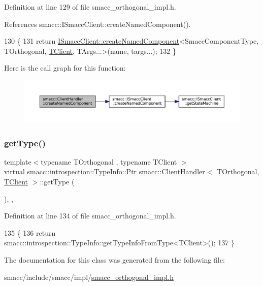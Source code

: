 Definition at line 129 of file smacc\+\_\+orthogonal\+\_\+impl.\+h.



References smacc\+::\+I\+Smacc\+Client\+::create\+Named\+Component().


\begin{DoxyCode}
130     \{
131         \textcolor{keywordflow}{return} \hyperlink{classsmacc_1_1ISmaccClient_affcc2f95bc993b5f07ef0d6ab6eec8f1}{ISmaccClient::createNamedComponent}<SmaccComponentType, 
      TOrthogonal, \hyperlink{classTClient}{TClient}, TArgs...>(name, targs...);
132     \}
\end{DoxyCode}
Here is the call graph for this function\+:
\nopagebreak
\begin{figure}[H]
\begin{center}
\leavevmode
\includegraphics[width=350pt]{classsmacc_1_1ClientHandler_a33f440a8e06038df0dd291d2ea278f39_cgraph}
\end{center}
\end{figure}
\mbox{\label{classsmacc_1_1ClientHandler_a018a50262de782c479414cf18daddac9}} 
\subsubsection{\texorpdfstring{get\+Type()}{getType()}}
{\footnotesize\ttfamily template$<$typename T\+Orthogonal , typename T\+Client $>$ \\
virtual \hyperlink{classsmacc_1_1introspection_1_1TypeInfo_aa6ffd9c39811d59f7c771941b7fad860}{smacc\+::introspection\+::\+Type\+Info\+::\+Ptr} \hyperlink{classsmacc_1_1ClientHandler}{smacc\+::\+Client\+Handler}$<$ T\+Orthogonal, \hyperlink{classTClient}{T\+Client} $>$\+::get\+Type (\begin{DoxyParamCaption}{ }\end{DoxyParamCaption})\hspace{0.3cm}{\ttfamily [inline]}, {\ttfamily [override]}, {\ttfamily [virtual]}}



Definition at line 134 of file smacc\+\_\+orthogonal\+\_\+impl.\+h.


\begin{DoxyCode}
135     \{
136         \textcolor{keywordflow}{return} smacc::introspection::TypeInfo::getTypeInfoFromType<TClient>();
137     \}
\end{DoxyCode}


The documentation for this class was generated from the following file\+:\begin{DoxyCompactItemize}
\item 
smacc/include/smacc/impl/\hyperlink{smacc__orthogonal__impl_8h}{smacc\+\_\+orthogonal\+\_\+impl.\+h}\end{DoxyCompactItemize}
